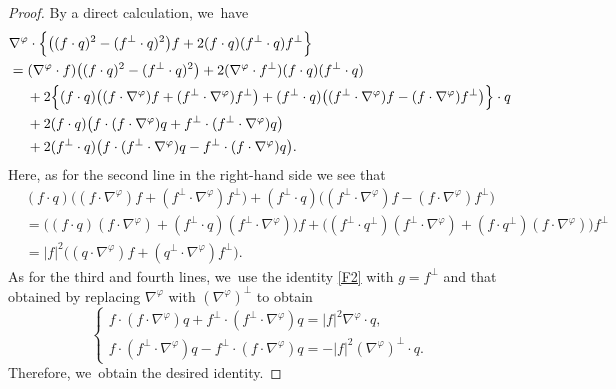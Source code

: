 \documentclass[JEP,XML,SOM,Unicode,NoFloatCountersInSection,published]{cedram}
\theoremstyle{definition}
\begin{document}
\begin{proof}
By a direct calculation, we~have
\begin{align*}
& \nabla^\varphi\cdot\Bigl\{ \bigl((f\cdot q)^2-(f^\perp\cdot q)^2 \bigr)f + 2(f\cdot q)(f^\perp\cdot q)f^\perp \Bigr\} \\
&= (\nabla^\varphi\cdot f)\bigl((f\cdot q)^2-(f^\perp\cdot q)^2 \bigr) + 2(\nabla^\varphi\cdot f^\perp)(f\cdot q)(f^\perp\cdot q) \\
&\quad\;
+ 2\Bigl\{ (f\cdot q)\bigl((f\cdot\nabla^\varphi)f + (f^\perp\cdot\nabla^\varphi)f^\perp \bigr)
+ (f^\perp\cdot q)\bigl((f^\perp\cdot\nabla^\varphi)f - (f\cdot\nabla^\varphi)f^\perp \bigr) \Bigr\}\cdot q \\
&\quad\;
+ 2(f\cdot q)\bigl(f\cdot(f\cdot\nabla^\varphi)q + f^\perp\cdot(f^\perp\cdot\nabla^\varphi)q \bigr)\\
&\quad\;
+ 2(f^\perp\cdot q)\bigl(f\cdot(f^\perp\cdot\nabla^\varphi)q - f^\perp\cdot(f\cdot\nabla^\varphi)q \bigr).
\end{align*}
Here, as for the second line in the right-hand side we see that
\begin{align*}
& (f\cdot q)\bigl((f\cdot\nabla^\varphi)f + (f^\perp\cdot\nabla^\varphi)f^\perp \bigr)
+ (f^\perp\cdot q)\bigl((f^\perp\cdot\nabla^\varphi)f - (f\cdot\nabla^\varphi)f^\perp \bigr) \\
&= \bigl((f\cdot q)(f\cdot\nabla^\varphi) + (f^\perp\!\cdot q)(f^\perp\cdot\nabla^\varphi) \bigr)f
+ \bigl((f^\perp\cdot q^\perp)(f^\perp\cdot\nabla^\varphi) + (f\cdot q^\perp)(f\cdot\nabla^\varphi) \bigr)f^\perp \\
&= |f|^2 \bigl((q\cdot\nabla^\varphi)f + (q^\perp\cdot\nabla^\varphi)f^\perp \bigr).
\end{align*}
As for the third and fourth lines, we~use the identity \eqref{F2} with $g=f^\perp$ and that obtained by replacing $\nabla^\varphi$ with $(\nabla^\varphi)^\perp$ to obtain
\[
\begin{cases}
f\cdot(f\cdot\nabla^\varphi)q + f^\perp\cdot(f^\perp\cdot\nabla^\varphi)q = |f|^2\nabla^\varphi\cdot q, \\
f\cdot(f^\perp\cdot\nabla^\varphi)q - f^\perp\cdot(f\cdot\nabla^\varphi)q = -|f|^2(\nabla^\varphi)^\perp\cdot q.
\end{cases}
\]
Therefore, we~obtain the desired identity.
\end{proof}
\end{document}

